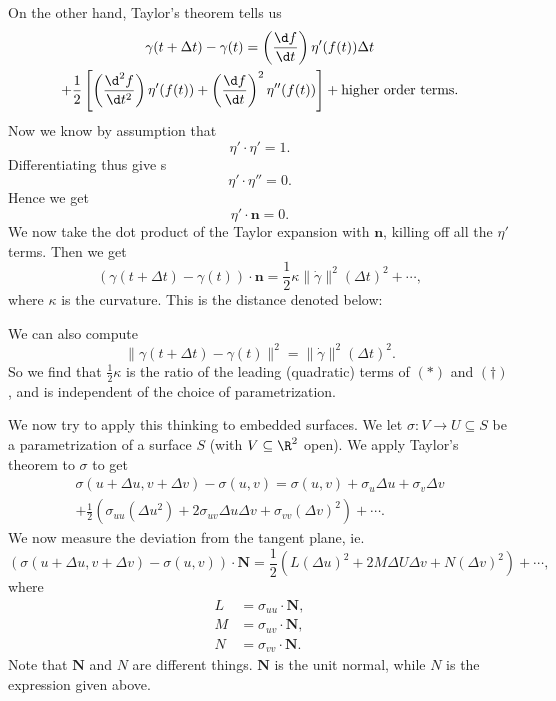 \documentclass[a4paper]{article}
\begin{document}
On the other hand, Taylor's theorem tells us
\begin{multline*}
  \gamma(t + \Delta t) - \gamma(t) = \left(\frac{\d f}{\d t}\right) \eta'(f(t)) \Delta t \\
  + \frac{1}{2} \left[\left(\frac{\d^2 f}{\d t^2}\right) \eta'(f(t)) + \left(\frac{\d f}{\d t}\right)^2 \eta''(f(t))\right] + \text{higher order terms}.
\end{multline*}
Now we know by assumption that
\[
  \eta' \cdot \eta' = 1.
\]
Differentiating thus give
s\[
  \eta' \cdot \eta'' = 0.
\]
Hence we get
\[
  \eta' \cdot \mathbf{n} = 0.
\]
We now take the dot product of the Taylor expansion with $\mathbf{n}$, killing off all the $\eta'$ terms. Then we get
\[
  (\gamma(t + \Delta t) - \gamma(t)) \cdot \mathbf{n} = \frac{1}{2} \kappa \|\dot{\gamma}\|^2 (\Delta t)^2 + \cdots,\tag{$*$}
\]
where $\kappa$ is the curvature. This is the distance denoted below:
\begin{center}
\end{center}
We can also compute
\[
  \|\gamma(t + \Delta t) - \gamma(t)\|^2 = \|\dot{\gamma}\|^2 (\Delta t)^2.\tag{$\dagger$}
\]
So we find that $\frac{1}{2}\kappa$ is the ratio of the leading (quadratic) terms of $(*)$ and $(\dagger)$, and is independent of the choice of parametrization.

We now try to apply this thinking to embedded surfaces. We let $\sigma: V \to U \subseteq S$ be a parametrization of a surface $S$ (with $V \subseteq \R^2$ open). We apply Taylor's theorem to $\sigma$ to get
\begin{multline*}
  \sigma(u + \Delta u, v + \Delta v) - \sigma(u, v) = \sigma(u, v) + \sigma_u \Delta u + \sigma_v \Delta v \\
  + \frac{1}{2}(\sigma_{uu} (\Delta u^2) + 2 \sigma_{uv} \Delta u \Delta v + \sigma_{vv} (\Delta v)^2) + \cdots.
\end{multline*}
We now measure the deviation from the tangent plane, ie.
\[
  (\sigma(u + \Delta u, v + \Delta v) - \sigma(u, v))\cdot \mathbf{N} = \frac{1}{2}(L(\Delta u)^2 + 2M\Delta U \Delta v + N (\Delta v)^2) + \cdots,
\]
where
\begin{align*}
  L &= \sigma_{uu} \cdot \mathbf{N},\\
  M &= \sigma_{uv} \cdot \mathbf{N},\\
  N &= \sigma_{vv} \cdot \mathbf{N}.
\end{align*}
Note that $\mathbf{N}$ and $N$ are different things. $\mathbf{N}$ is the unit normal, while $N$ is the expression given above.
\end{document}
